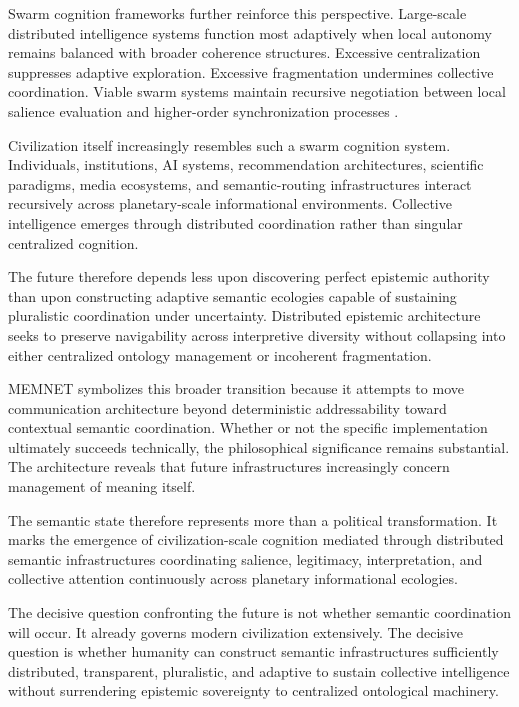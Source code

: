 \documentclass[11pt,a4paper]{article}
\begin{document}
Swarm cognition frameworks further reinforce this perspective. Large-scale distributed intelligence systems function most adaptively when local autonomy remains balanced with broader coherence structures. Excessive centralization suppresses adaptive exploration. Excessive fragmentation undermines collective coordination. Viable swarm systems maintain recursive negotiation between local salience evaluation and higher-order synchronization processes \cite{bonabeau1999}.

Civilization itself increasingly resembles such a swarm cognition system. Individuals, institutions, AI systems, recommendation architectures, scientific paradigms, media ecosystems, and semantic-routing infrastructures interact recursively across planetary-scale informational environments. Collective intelligence emerges through distributed coordination rather than singular centralized cognition.

The future therefore depends less upon discovering perfect epistemic authority than upon constructing adaptive semantic ecologies capable of sustaining pluralistic coordination under uncertainty. Distributed epistemic architecture seeks to preserve navigability across interpretive diversity without collapsing into either centralized ontology management or incoherent fragmentation.

MEMNET symbolizes this broader transition because it attempts to move communication architecture beyond deterministic addressability toward contextual semantic coordination. Whether or not the specific implementation ultimately succeeds technically, the philosophical significance remains substantial. The architecture reveals that future infrastructures increasingly concern management of meaning itself.

The semantic state therefore represents more than a political transformation. It marks the emergence of civilization-scale cognition mediated through distributed semantic infrastructures coordinating salience, legitimacy, interpretation, and collective attention continuously across planetary informational ecologies.

The decisive question confronting the future is not whether semantic coordination will occur. It already governs modern civilization extensively. The decisive question is whether humanity can construct semantic infrastructures sufficiently distributed, transparent, pluralistic, and adaptive to sustain collective intelligence without surrendering epistemic sovereignty to centralized ontological machinery.
\end{document}
